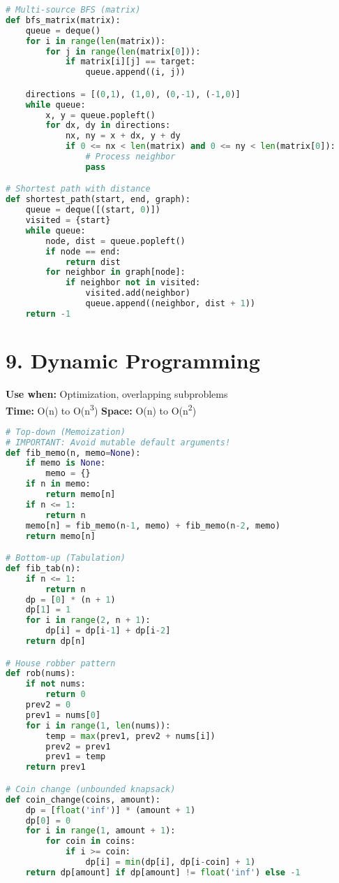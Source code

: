 \documentclass[8pt,landscape]{article}
\begin{document}
\begin{multicols}{3}
\begin{lstlisting}[language=Python]
# Multi-source BFS (matrix)
def bfs_matrix(matrix):
    queue = deque()
    for i in range(len(matrix)):
        for j in range(len(matrix[0])):
            if matrix[i][j] == target:
                queue.append((i, j))

    directions = [(0,1), (1,0), (0,-1), (-1,0)]
    while queue:
        x, y = queue.popleft()
        for dx, dy in directions:
            nx, ny = x + dx, y + dy
            if 0 <= nx < len(matrix) and 0 <= ny < len(matrix[0]):
                # Process neighbor
                pass

# Shortest path with distance
def shortest_path(start, end, graph):
    queue = deque([(start, 0)])
    visited = {start}
    while queue:
        node, dist = queue.popleft()
        if node == end:
            return dist
        for neighbor in graph[node]:
            if neighbor not in visited:
                visited.add(neighbor)
                queue.append((neighbor, dist + 1))
    return -1
\end{lstlisting}

\section*{9. Dynamic Programming}
\textbf{Use when:} Optimization, overlapping subproblems \\
\textbf{Time:} O(n) to O(n\textsuperscript{3}) \quad \textbf{Space:} O(n) to O(n\textsuperscript{2})
\begin{lstlisting}[language=Python]
# Top-down (Memoization)
# IMPORTANT: Avoid mutable default arguments!
def fib_memo(n, memo=None):
    if memo is None:
        memo = {}
    if n in memo:
        return memo[n]
    if n <= 1:
        return n
    memo[n] = fib_memo(n-1, memo) + fib_memo(n-2, memo)
    return memo[n]

# Bottom-up (Tabulation)
def fib_tab(n):
    if n <= 1:
        return n
    dp = [0] * (n + 1)
    dp[1] = 1
    for i in range(2, n + 1):
        dp[i] = dp[i-1] + dp[i-2]
    return dp[n]

# House robber pattern
def rob(nums):
    if not nums:
        return 0
    prev2 = 0
    prev1 = nums[0]
    for i in range(1, len(nums)):
        temp = max(prev1, prev2 + nums[i])
        prev2 = prev1
        prev1 = temp
    return prev1

# Coin change (unbounded knapsack)
def coin_change(coins, amount):
    dp = [float('inf')] * (amount + 1)
    dp[0] = 0
    for i in range(1, amount + 1):
        for coin in coins:
            if i >= coin:
                dp[i] = min(dp[i], dp[i-coin] + 1)
    return dp[amount] if dp[amount] != float('inf') else -1


\end{lstlisting}
\end{multicols}
\end{document}
